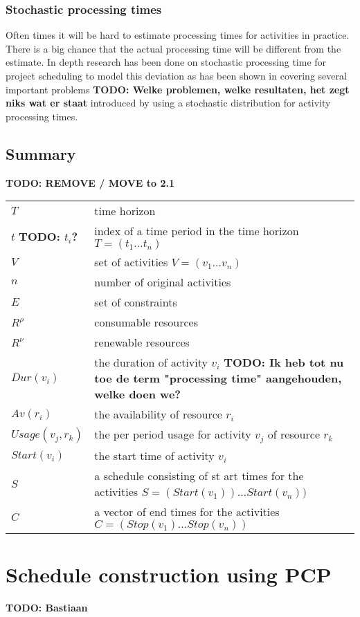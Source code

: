 \documentclass{article}
\newcommand{\TODO}[1]{{\color{red}\textbf{TODO: #1}}}
\newcommand{\renres}[0]{R^\rho} %
\newcommand{\conres}[0]{R^\nu} %
\newcommand{\av}[1]{\textit{Av}(#1)} %
\newcommand{\dur}[1]{\textit{Dur}(#1)} %
\newcommand{\usage}[1]{\textit{Usage}(#1)} %
\newcommand{\start}[1]{\textit{Start}(#1)} %
\begin{document}
\subsubsection{Stochastic processing times}
Often times it will be hard to estimate processing times for activities in practice.
There is a big chance that the actual processing time will be  different from the estimate.
In depth research has been done on stochastic processing time for project scheduling to model this deviation as has been shown in \cite{brucker99} covering several important problems \TODO{Welke problemen, welke resultaten, het zegt niks wat er staat} introduced by using a stochastic distribution for activity processing times.

\subsection{Summary}
\TODO{REMOVE / MOVE to 2.1}
\begin{tabular}{l l}
\hline
$T$ & time horizon \\
$t$ \TODO{$t_i$?} &  index of a time period in the time horizon $T = (t_1 \ldots t_n)$\\
$V$ & set of activities $V = (v_1 \ldots v_n)$ \\
$n$ & number of original activities \\
$E$ & set of constraints \\
$\renres$ & consumable resources \\
$\conres$ & renewable resources \\
$\dur{v_i}$ & the duration of activity $v_i$ \TODO{Ik heb tot nu toe de term "processing time" aangehouden, welke doen we?}\\
$\av{r_i}$ & the availability of resource $r_i$ \\
$\usage{v_j, r_k}$ & the per period usage for activity $v_j$ of resource $r_k$ \\
$\start{v_i}$ & the start time of activity $v_i$ \\
$S$ & a schedule consisting of st
art times for the activities $S = (\start{v_1}) \ldots \start{v_n})$ \\
$C$ & a vector of end times for the activities $C = (Stop(v_1) \ldots Stop(v_n))$ \\
\hline
\end{tabular}

\newpage

\section{Schedule construction using PCP}
\TODO{Bastiaan}
\end{document}
